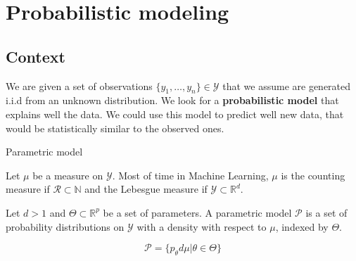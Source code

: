\documentclass[
10pt, %
a4paper, %
oneside, %
headinclude,footinclude, %
BCOR5mm, %
]{scrartcl}
\begin{document}
% 
% 
% 

\section{\large\color{Blue}Probabilistic modeling}

\subsection{\large\color{MidnightBlue}Context}

We are given a set of observations $\{y_1, \dots, y_n\}\in \mathcal{Y} $ that we assume are generated i.i.d from an unknown distribution. We look for a \textbf{{probabilistic model}} that explains well the data. We could use this model to predict well new data, that would be statistically similar to the observed ones.

\begin{definition}{Parametric model}

    Let $\mu$ be a measure on $ \mathcal{Y}$. Most of time in Machine Learning, $\mu$ is the counting measure if $ \mathcal{R} \subset \mathbb{N} $ and the Lebesgue measure if $ \mathcal{Y} \subset \mathbb{R}^d$.

    Let $d>1$ and $ \Theta\subset \mathbb{R}^p$ be a set of parameters. A parametric model $ \mathcal{P} $ is a set of probability distributions on $ \mathcal{Y} $ with a density with respect to $\mu$, indexed by $ \Theta $.

    \begin{equation*}
	\mathcal{P}  = \{p_{\theta}d\mu|\theta \in \Theta \}
    \end{equation*}
\end{definition}
\end{document}
